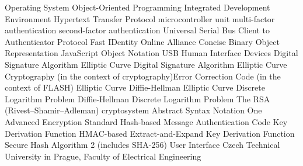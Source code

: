       {Operating System}
     {Object-Oriented Programming}
     {Integrated Development Environment}
    {Hypertext Transfer Protocol}
     {microcontroller unit}
     {multi-factor authentication}
     {second-factor authentication}
     {Universal Serial Bus}
    {Client to Authenticator Protocol}
    {Fast IDentity Online Alliance}
    {Concise Binary Object Representation}
    {JavaScript Object Notation}
     {USB Human Interface Devices}
     {Digital Signature Algorithm}
   {Elliptic Curve Digital Signature Algorithm}
     {Elliptic Curve Cryptography (in the context of cryptography){\nl}Error Correction Code (in the context of FLASH)}
    {Elliptic Curve Diffie-Hellman}
   {Elliptic Curve Discrete Logarithm Problem}
      {Diffie-Hellman}
     {Discrete Logarithm Problem}
     {The RSA (Rivest–Shamir–Adleman) cryptosystem}
   {Abstract Syntax Notation One}
     {Advanced Encryption Standard}
    {Hash-based Message Authentication Code}
     {Key Derivation Function}
    {HMAC-based Extract-and-Expand Key Derivation Function}
   {Secure Hash Algorithm 2 (includes SHA-256)}
      {User Interface}
 {Czech Technical University in Prague, Faculty of Electrical Engineering}
